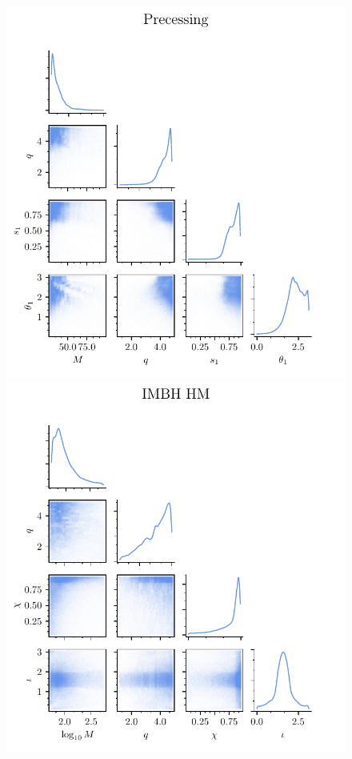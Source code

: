 \documentclass[twocolumn,showpacs,preprintnumbers,nofootinbib,prd,
superscriptaddress,10pt]{revtex4-2}
\begin{document}
\begin{figure}[t]
	\includegraphics{bank_scatter_Precessing}\hfill
	\includegraphics{bank_scatter_IMBH_HM}\hfill

\end{figure}
\end{document}
